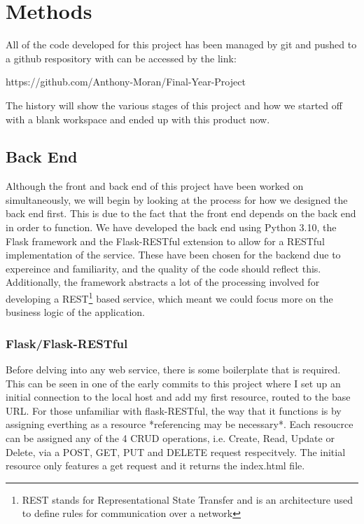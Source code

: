 \chapter{Methods}
\label{chapter2}

All of the code developed for this project has been managed by git and pushed to a github respository with can be accessed by the link:

\begin{center}
    https://github.com/Anthony-Moran/Final-Year-Project
\end{center}

The history will show the various stages of this project and how we started off with a blank workspace and ended up with this product now.

\section{Back End}

Although the front and back end of this project have been worked on simultaneously, we will begin by looking at the process for how we designed the back end first. This is due to the fact that the front end depends on the back end in order to function.
We have developed the back end using Python 3.10, the Flask framework and the Flask-RESTful extension to allow for a RESTful implementation of the service. These have been chosen for the backend due to expereince and familiarity, and the quality of the code should reflect this. Additionally, the framework abstracts a lot of the processing involved for developing a REST\footnote{REST stands for Representational State Transfer and is an architecture used to define rules for communication over a network} based service, which meant we could focus more on the business logic of the application.

\subsection{Flask/Flask-RESTful}

Before delving into any web service, there is some boilerplate that is required. This can be seen in one of the early commits to this project where I set up an initial connection to the local host and add my first resource, routed to the base URL. For those unfamiliar with flask-RESTful, the way that it functions is by assigning everthing as a resource *referencing may be necessary*. Each resoucrce can be assigned any of the 4 CRUD operations, i.e. Create, Read, Update or Delete, via a POST, GET, PUT and DELETE request respecitvely. The initial resource only features a get request and it returns the index.html file.

